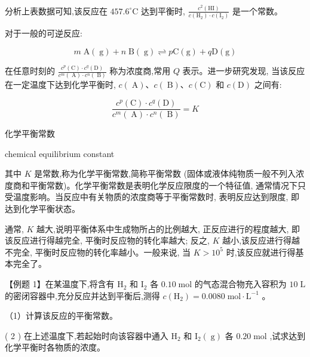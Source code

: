 \documentclass[10pt]{article}
\begin{document}
分析上表数据可知,该反应在 \({457.6}^{ \circ }\mathrm{C}\) 达到平衡时, \(\frac{{c}^{2}\left( \mathrm{{HI}}\right) }{c\left( {\mathrm{H}}_{2}\right) \cdot c\left( {\mathrm{I}}_{2}\right) }\) 是一个常数。

对于一般的可逆反应:

\[
m\mathrm{\;A}\left( \mathrm{\;g}\right) + n\mathrm{\;B}\left( \mathrm{\;g}\right) \rightleftharpoons p\mathrm{C}\left( \mathrm{g}\right) + q\mathrm{D}\left( \mathrm{g}\right)
\]

在任意时刻的 \(\frac{{c}^{p}\left( \mathrm{C}\right) \cdot {c}^{q}\left( \mathrm{D}\right) }{{c}^{m}\left( \mathrm{\;A}\right) \cdot {c}^{n}\left( \mathrm{\;B}\right) }\) 称为浓度商,常用 \(Q\) 表示。进一步研究发现, 当该反应在一定温度下达到化学平衡时, \(c\left( \mathrm{\;A}\right) \text{、}c\left( \mathrm{\;B}\right) \text{、}c\left( \mathrm{C}\right)\) 和 \(c\left( \mathrm{D}\right)\) 之间有:

\[
\frac{{c}^{p}\left( \mathrm{C}\right) \cdot {c}^{q}\left( \mathrm{D}\right) }{{c}^{m}\left( \mathrm{\;A}\right) \cdot {c}^{n}\left( \mathrm{\;B}\right) } = K
\]

\begin{mdframed}

化学平衡常数

chemical equilibrium constant

\end{mdframed}

其中 \(K\) 是常数,称为化学平衡常数,简称平衡常数 (固体或液体纯物质一般不列入浓度商和平衡常数)。化学平衡常数是表明化学反应限度的一个特征值, 通常情况下只受温度影响。当反应中有关物质的浓度商等于平衡常数时, 表明反应达到限度, 即达到化学平衡状态。

通常, \(K\) 越大,说明平衡体系中生成物所占的比例越大, 正反应进行的程度越大, 即该反应进行得越完全, 平衡时反应物的转化率越大; 反之, \(K\) 越小,该反应进行得越不完全, 平衡时反应物的转化率越小。一般来说, 当 \(K > {10}^{5}\) 时,该反应就进行得基本完全了。

【例题 1】在某温度下,将含有 \({\mathrm{H}}_{2}\) 和 \({\mathrm{I}}_{2}\) 各 \({0.10}\mathrm{\;{mol}}\) 的气态混合物充入容积为 \({10}\mathrm{\;L}\) 的密闭容器中,充分反应并达到平衡后,测得 \(c\left( {\mathrm{H}}_{2}\right) = {0.0080}\mathrm{\;{mol}} \cdot {\mathrm{L}}^{-1}\) 。

（1）计算该反应的平衡常数。

( 2 ) 在上述温度下,若起始时向该容器中通入 \({\mathrm{H}}_{2}\) 和 \({\mathrm{I}}_{2}\left( \mathrm{\;g}\right)\) 各 \({0.20}\mathrm{\;{mol}}\) ,试求达到化学平衡时各物质的浓度。
\end{document}

